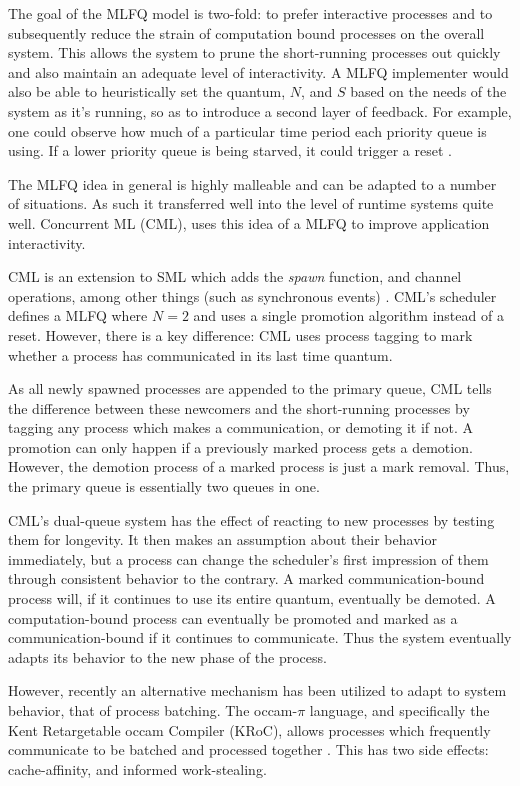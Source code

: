 The goal of the MLFQ model is two-fold: to prefer interactive processes and 
to subsequently reduce the strain of computation bound processes on the overall 
system. This allows the system to prune the short-running processes out quickly
and also maintain an adequate level of interactivity. A MLFQ implementer would 
also be able to heuristically set the quantum, $N$, and $S$ based on the needs 
of the system as it's running, so as to introduce a second layer of feedback. 
For example, one could observe how much of a particular time period each
priority queue is using. If a lower priority queue is being starved, it could
trigger a reset \cite{hoganson2009reducing}.

The MLFQ idea in general is highly malleable and can be adapted to a number of 
situations. As such it transferred well into the level of runtime 
systems quite well. Concurrent ML (CML), uses this idea of a MLFQ to improve 
application interactivity. 

CML is an extension to SML which adds the \emph{spawn} function, and channel 
operations, among other things (such as synchronous events) 
\cite{reppy1993concurrent}. CML's scheduler defines a MLFQ where $N=2$ and 
uses a single promotion algorithm instead of a reset. However, there is a key
difference: CML uses process tagging to mark whether a process has 
communicated in its last time quantum.

As all newly spawned processes are appended to the
primary queue, CML tells the difference between these newcomers and the
short-running processes by tagging any process which makes a communication, or
demoting it if not. A promotion can only happen if a previously marked process
gets a demotion. However, the demotion process of a marked process is just a 
mark removal. Thus, the primary queue is essentially two queues in one. 

CML's dual-queue system has the effect of reacting to new processes by testing 
them for longevity. It then makes an assumption about their behavior immediately, but a
process can change the scheduler's first impression of them through consistent
behavior to the contrary. A marked communication-bound process will, if it
continues to use its entire quantum, eventually be demoted. A computation-bound
process can eventually be promoted and marked as a communication-bound if it 
continues to communicate. Thus the system eventually adapts its behavior to
the new phase of the process.

However, recently an alternative mechanism has been utilized to adapt to system
behavior, that of process batching. The occam-$\pi$ language, and specifically 
the Kent Retargetable occam Compiler (KRoC), allows processes which frequently
communicate to be batched and processed together \cite{ritson2012multicore}. 
This has two side effects: cache-affinity, and informed work-stealing.

